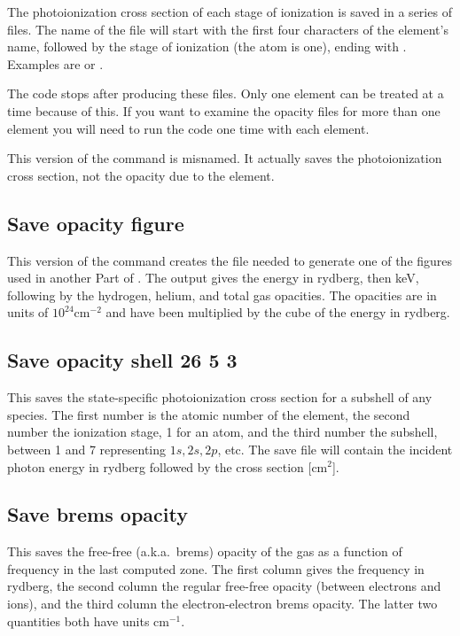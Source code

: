 The photoionization cross section of each stage of ionization is saved
in a series of files.  The name of the file will start with the first four
characters of the element's name, followed by the stage of ionization (the
atom is one), ending with .  Examples are  or
.

The code stops after producing these files.
Only one element can be treated at a time because of this.
If you want to examine the opacity files for more than one element
you will need to run the code one time with each element.

This version of the  command is misnamed.
It actually saves the photoionization cross section, not the opacity due to the element.

\subsection{Save opacity figure}

This version of the command creates the file needed to generate one of
the figures used in another Part of \Hazy.
The output gives the energy in rydberg,
then keV, following by the hydrogen, helium, and total gas opacities.
The
opacities are in units of $10^{24} \mathrm{cm}^{-2}$ and have been multiplied by the cube
of the energy in rydberg.

\subsection{Save opacity shell 26 5 3}

This saves the state-specific photoionization cross section for a
subshell of any species.  The first number is the atomic number of the
element, the second number the ionization stage, 1 for an atom, and the
third number the subshell, between 1 and 7 representing $1s, 2s, 2p$, etc.
The save file will contain the incident photon energy in rydberg
followed by the cross section [cm$^2$].

\subsection{Save brems opacity}

This saves the free-free (a.k.a.\ brems) opacity of the gas as a function of
frequency in the last computed zone. The first column gives the frequency in
rydberg, the second column the regular free-free opacity (between electrons
and ions), and the third column the electron-electron brems opacity. The
latter two quantities both have units cm$^{-1}$.

